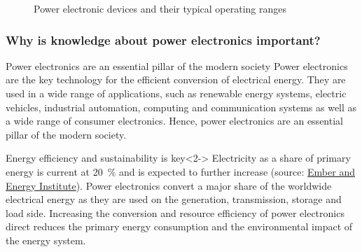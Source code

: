 \begin{frame}[c]
\begin{figure}
			  \label{fig:power_electronic_devices}
			  \caption{Power electronic devices and their typical operating ranges}
		\end{figure}
	\vspace{-0.5cm}
\end{frame}

\begin{frame}
	\frametitle{Why is knowledge about power electronics important?}
	\begin{varblock}{Power electronics are an essential pillar of the modern society}
		Power electronics are the key technology for the efficient conversion of electrical energy. They are used in a wide range of applications, such as renewable energy systems, electric vehicles, industrial automation, computing and communication systems as well as a wide range of consumer electronics. Hence, power electronics are an essential pillar of the modern society.  
	\end{varblock}
	\begin{varblock}{Energy efficiency and sustainability is key}<2->
		Electricity as a share of primary energy is current at \SI{20}{\percent} and is expected to further increase (source: \href{https://ourworldindata.org/grapher/electricity-as-a-share-of-primary-energy}{Ember and Energy Institute}). Power electronics convert a major share of the worldwide electrical energy as they are used on the generation, transmission, storage and load side. Increasing the conversion and resource efficiency of power electronics direct reduces the primary energy consumption and the environmental impact of the energy system. 
	\end{varblock}
\end{frame}


